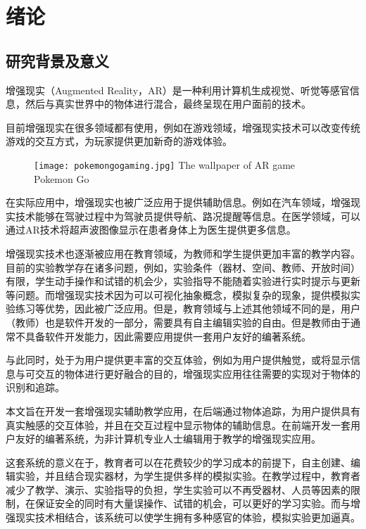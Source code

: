\chapter{绪论}
\label{chap:myIntro}

\section{研究背景及意义}
\label{sec:background}
增强现实（Augmented Reality，AR）是一种利用计算机生成视觉、听觉等感官信息，然后与真实世界中的物体进行混合，最终呈现在用户面前的技术。\cite{ARconception}

目前增强现实在很多领域都有使用，例如在游戏领域，增强现实技术可以改变传统游戏的交互方式，为玩家提供更加新奇的游戏体验。
    
\begin{figure}[!htp]
  \centering
  \texttt{[image: pokemongogaming.jpg]}
    {The wallpaper of AR game Pokemon Go}
 \label{fig:longcaptionbad}
\end{figure}

在实际应用中，增强现实也被广泛应用于提供辅助信息。例如在汽车领域，增强现实技术能够在驾驶过程中为驾驶员提供导航、路况提醒等信息。\cite{ARdriving}在医学领域，可以通过AR技术将超声波图像显示在患者身体上为医生提供更多信息。\cite{billinghurst2002augmented}

增强现实技术也逐渐被应用在教育领域，为教师和学生提供更加丰富的教学内容。目前的实验教学存在诸多问题，例如，实验条件（器材、空间、教师、开放时间）有限，学生动手操作和试错的机会少，实验指导不能随着实验进行实时提示与更新等问题。而增强现实技术因为可以可视化抽象概念，模拟复杂的现象，提供模拟实验练习等优势，因此被广泛应用。\cite{wu2013current}但是，教育领域与上述其他领域不同的是，用户（教师）也是软件开发的一部分，需要具有自主编辑实验的自由。但是教师由于通常不具备软件开发能力，因此需要应用提供一套用户友好的编著系统。

与此同时，处于为用户提供更丰富的交互体验，例如为用户提供触觉，或将显示信息与可交互的物体进行更好融合的目的，增强现实应用往往需要的实现对于物体的识别和追踪。

本文旨在开发一套增强现实辅助教学应用，在后端通过物体追踪，为用户提供具有真实触感的交互体验，并且在交互过程中显示物体的辅助信息。在前端开发一套用户友好的编著系统，为非计算机专业人士编辑用于教学的增强现实应用。

这套系统的意义在于，教育者可以在花费较少的学习成本的前提下，自主创建、编辑实验，并且结合现实器材，为学生提供多样的模拟实验。在教学过程中，教育者减少了教学、演示、实验指导的负担，学生实验可以不再受器材、人员等因素的限制，在保证安全的同时有大量误操作、试错的机会，可以更好的学习实验。而与增强现实技术相结合，该系统可以使学生拥有多种感官的体验，模拟实验更加逼真。



